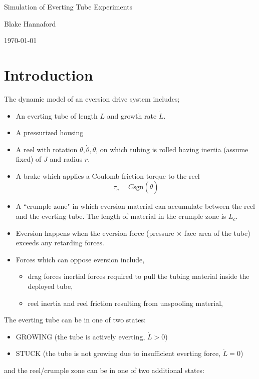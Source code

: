 \documentclass[letterpaper]{article}
\begin{document}
\begin{centering}
{\Large   Simulation of Everting Tube Experiments}

Blake Hannaford

\today

\end{centering}

\section{Introduction}
The dynamic model of an eversion drive system includes;
\begin{itemize}
  \item An everting tube of length $L$ and growth rate $\dot{L}$.
  \item A pressurized housing
  \item A reel with rotation $\theta, \dot{\theta}, \ddot{\theta}$, on which tubing is rolled having inertia (assume fixed) of
  $J$ and radius $r$.
  \item A brake which applies a Coulomb friction torque to the reel
  \[
    \tau_c = C\mathrm{sgn}(\dot{\theta})
  \]
  \item A ``crumple zone" in which eversion material can accumulate
  between the reel and the everting tube. The length of material in
  the crumple zone is $L_c$.
  \item Eversion happens when the eversion force (pressure $\times$ face area of the tube) exceeds any retarding forces.
  \item Forces which can oppose eversion include,
  \begin{itemize}
    \item drag forces inertial forces required to pull the tubing material
    inside the deployed tube,
    \item reel inertia and reel friction resulting from unspooling material,
  \end{itemize}
\end{itemize}

\noindent
The everting tube can be in one of two states:
\begin{itemize}
  \item GROWING (the tube is actively everting, $\dot{L}>0$)
  \item STUCK (the tube is not growing due to insufficient everting force, $\dot{L}=0$)
\end{itemize}
and the reel/crumple zone can be in one of two additional states:
\end{document}
